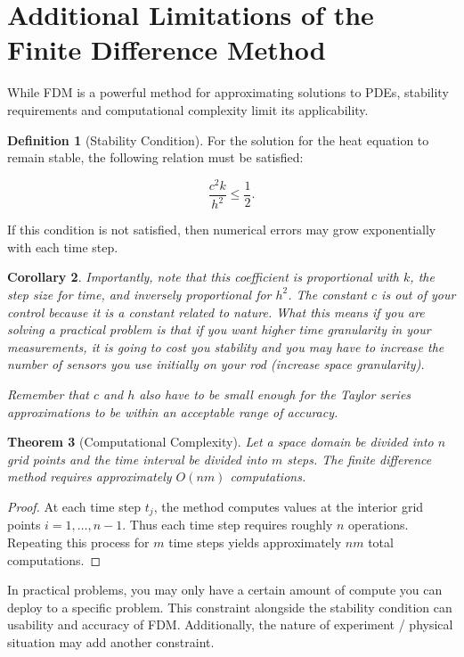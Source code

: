 \documentclass[12pt,letterpaper,reqno]{amsart}
\newtheorem{thm}{Theorem}
\newtheorem{cor}[thm]{Corollary}
\theoremstyle{definition}
\newtheorem{Definition}[thm]{Definition}
\numberwithin{thm}{section}
\theoremstyle{remark}
\begin{document}
\section{Additional Limitations of the Finite Difference Method}
\label{sec:limitations}

While FDM is a powerful method for approximating solutions to PDEs, stability requirements and computational complexity limit its applicability. 

\begin{Definition}[Stability Condition]
\label{def:stability}
For the solution for the heat equation to remain stable, the following relation must be satisfied: 

\[
\frac{c^2 k}{h^2} \le \frac{1}{2}.
\]

If this condition is not satisfied, then numerical errors may grow exponentially with each time step.\\
\end{Definition}

\begin{cor}
Importantly, note that this coefficient is proportional with $k$, the step size for time, and inversely proportional for $h^2$. The constant $c$ is out of your control because it is a constant related to nature. What this means if you are solving a practical problem is that if you want higher time granularity in your measurements, it is going to cost you stability and you may have to increase the number of sensors you use initially on your rod (increase space granularity).  

Remember that $c$ and $h$ also have to be small enough for the Taylor series approximations to be within an acceptable range of accuracy. 
\end{cor}

\begin{thm}[Computational Complexity]
\label{thm:complexity}
Let a space domain be divided into $n$ grid points and the time interval be divided into $m$ steps. The finite difference method requires approximately $O(nm)$ computations.
\end{thm}

\begin{proof}
At each time step $t_j$, the method computes values at the interior grid points $i=1,\dots,n-1$. Thus each time step requires roughly $n$  operations. Repeating this process for $m$ time steps yields approximately $nm$ total computations.
\end{proof}

In practical problems, you may only have a certain amount of compute you can deploy to a specific problem. This constraint alongside the stability condition can usability and accuracy of FDM. Additionally, the nature of experiment / physical situation may add another constraint. 
\end{document}
